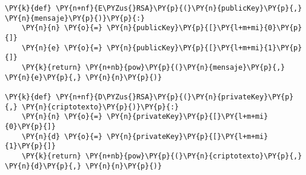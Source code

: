 

\begin{Verbatim}[commandchars=\\\{\}]
\PY{k}{def} \PY{n+nf}{E\PYZus{}RSA}\PY{p}{(}\PY{n}{publicKey}\PY{p}{,} \PY{n}{mensaje}\PY{p}{)}\PY{p}{:} 
    \PY{n}{n} \PY{o}{=} \PY{n}{publicKey}\PY{p}{[}\PY{l+m+mi}{0}\PY{p}{]}
    \PY{n}{e} \PY{o}{=} \PY{n}{publicKey}\PY{p}{[}\PY{l+m+mi}{1}\PY{p}{]}
    \PY{k}{return} \PY{n+nb}{pow}\PY{p}{(}\PY{n}{mensaje}\PY{p}{,} \PY{n}{e}\PY{p}{,} \PY{n}{n}\PY{p}{)}

\PY{k}{def} \PY{n+nf}{D\PYZus{}RSA}\PY{p}{(}\PY{n}{privateKey}\PY{p}{,} \PY{n}{criptotexto}\PY{p}{)}\PY{p}{:} 
    \PY{n}{n} \PY{o}{=} \PY{n}{privateKey}\PY{p}{[}\PY{l+m+mi}{0}\PY{p}{]}
    \PY{n}{d} \PY{o}{=} \PY{n}{privateKey}\PY{p}{[}\PY{l+m+mi}{1}\PY{p}{]}
    \PY{k}{return} \PY{n+nb}{pow}\PY{p}{(}\PY{n}{criptotexto}\PY{p}{,} \PY{n}{d}\PY{p}{,} \PY{n}{n}\PY{p}{)}
\end{Verbatim}
